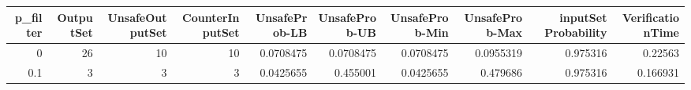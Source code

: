 \begin{tabular}{rrrrrrrrrr}
\hline
   p\_filter &   OutputSet &   UnsafeOutputSet &   CounterInputSet &   UnsafeProb-LB &   UnsafeProb-UB &   UnsafeProb-Min &   UnsafeProb-Max &   inputSet Probability &   VerificationTime \\
\hline
        0   &          26 &                10 &                10 &       0.0708475 &       0.0708475 &        0.0708475 &        0.0955319 &               0.975316 &           0.22563  \\
        0.1 &           3 &                 3 &                 3 &       0.0425655 &       0.455001  &        0.0425655 &        0.479686  &               0.975316 &           0.166931 \\
\hline
\end{tabular}
